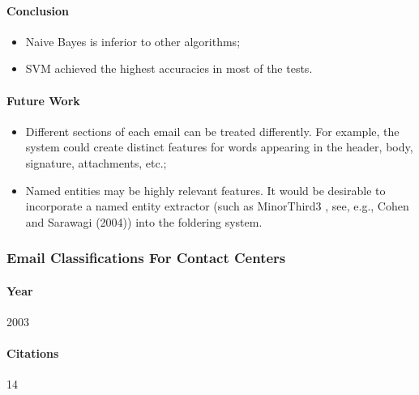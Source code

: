 \documentclass[12pt]{article}
\begin{document}
\paragraph{Conclusion}
\begin{itemize}
    \item Naive Bayes is inferior to other algorithms;
    \item SVM achieved the highest accuracies in most of the tests.
\end{itemize}

\paragraph{Future Work}
\begin{itemize}
    \item Different sections of each email can be treated differently. For example, the system could create distinct features for words appearing in the header, body, signature, attachments, etc.;
    \item Named entities may be highly relevant features. It would be desirable to incorporate a named entity extractor (such as MinorThird3 , see, e.g., Cohen and Sarawagi (2004)) into the foldering system.
\end{itemize}





\subsubsection{Email Classifications For Contact Centers}
\paragraph{Year} 2003
\paragraph{Citations} 14
\end{document}
